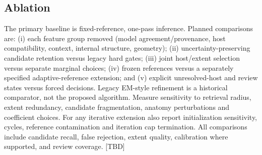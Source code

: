 \documentclass[fleqn,10pt]{olplainarticle}
\begin{document}
\subsection{Ablation}
\label{sec:ablation}
The primary baseline is fixed-reference, one-pass inference. Planned comparisons are: (i) each feature group removed
(model agreement/provenance, host compatibility, context, internal structure, geometry); (ii) uncertainty-preserving
candidate retention versus legacy hard gates; (iii) joint host/extent selection versus separate marginal choices;
(iv) frozen references versus a separately specified adaptive-reference extension; and (v) explicit unresolved-host and
review states versus forced decisions. Legacy EM-style refinement is a historical comparator, not the proposed algorithm.
Measure sensitivity to retrieval radius, extent redundancy, candidate fragmentation, anatomy perturbations and coefficient
choices. For any iterative extension also report initialization sensitivity, cycles, reference contamination and iteration
cap termination. All comparisons include candidate recall, false rejection, extent quality, calibration where supported,
and review coverage. [TBD]
\end{document}
